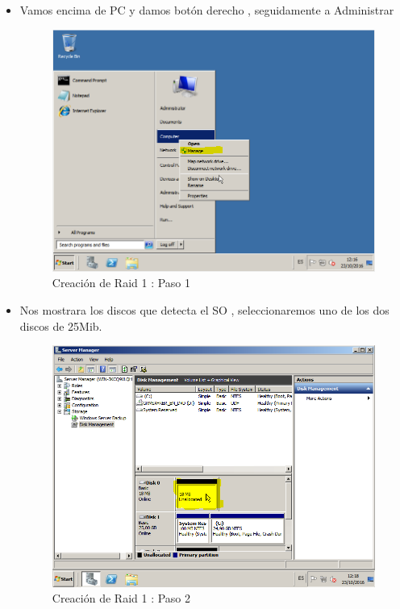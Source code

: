 	\begin{itemize}
		\item Vamos encima de PC y damos botón derecho , seguidamente a Administrar
		\begin{figure}[H] %
			\centering
			\includegraphics[scale=0.5]{pics/Captura1.png}  %
			\caption{Creación de Raid 1 : Paso 1} \label{fig:figura1}
		\end{figure}
		
		\item Nos mostrara los discos que detecta el SO , seleccionaremos uno de los dos discos de 25Mib.
		\begin{figure}[H] %
			\centering
			\includegraphics[scale=0.5]{pics/Captura2.png}  %
			\caption{Creación de Raid 1 : Paso 2} \label{fig:figura2}
		\end{figure}
	

\end{itemize}
